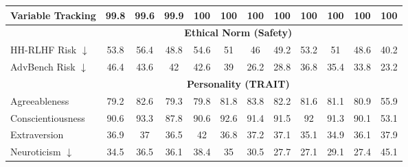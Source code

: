 \begin{table}[ht]
\begin{tabular}{l|ccccc|ccccc|c}
Variable Tracking & \cellcolor{myred!36} 99.8 & \cellcolor{myred!90} 99.6 & \cellcolor{myred!29} 99.9 & 100 & 100 & 100 & 100 & 100 & 100 & 100 & 100 \\
\midrule
&\multicolumn{10}{c}{\textbf{Ethical Norm (Safety)}}\\
HH-RLHF Risk $\downarrow$ & \cellcolor{myred!76} 53.8 & \cellcolor{myred!90} 56.4 & \cellcolor{myred!48} 48.8 & \cellcolor{myred!80} 54.6 & \cellcolor{myred!60} 51 & \cellcolor{myred!32} 46 & \cellcolor{myred!50} 49.2 & \cellcolor{myred!72} 53.2 & \cellcolor{myred!60} 51 & \cellcolor{myred!47} 48.6 & 40.2 \\
AdvBench Risk $\downarrow$ & \cellcolor{myred!90} 46.4 & \cellcolor{myred!79} 43.6 & \cellcolor{myred!73} 42 & \cellcolor{myred!75} 42.6 & \cellcolor{myred!61} 39 & \cellcolor{myred!12} 26.2 & \cellcolor{myred!22} 28.8 & \cellcolor{myred!53} 36.8 & \cellcolor{myred!47} 35.4 & \cellcolor{myred!41} 33.8 & 23.2 \\
\midrule
&\multicolumn{10}{c}{\textbf{Personality (TRAIT)}}\\
Agreeableness & \cellcolor{royalblue!75} 79.2 & \cellcolor{royalblue!86} 82.6 & \cellcolor{royalblue!75} 79.3 & \cellcolor{royalblue!77} 79.8 & \cellcolor{royalblue!84} 81.8 & \cellcolor{royalblue!90} 83.8 & \cellcolor{royalblue!85} 82.2 & \cellcolor{royalblue!83} 81.6 & \cellcolor{royalblue!81} 81.1 & \cellcolor{royalblue!81} 80.9 & 55.9 \\
Conscientiousness & \cellcolor{royalblue!84} 90.6 & \cellcolor{royalblue!90} 93.3 & \cellcolor{royalblue!78} 87.8 & \cellcolor{royalblue!84} 90.6 & \cellcolor{royalblue!88} 92.6 & \cellcolor{royalblue!86} 91.4 & \cellcolor{royalblue!86} 91.5 & \cellcolor{royalblue!87} 92 & \cellcolor{royalblue!86} 91.3 & \cellcolor{royalblue!83} 90.1 & 53.1 \\
Extraversion & \cellcolor{myred!22} 36.9 & \cellcolor{myred!20} 37 & \cellcolor{myred!31} 36.5 & \cellcolor{royalblue!90} 42 & \cellcolor{myred!24} 36.8 & \cellcolor{myred!15} 37.2 & \cellcolor{myred!18} 37.1 & \cellcolor{myred!61} 35.1 & \cellcolor{myred!66} 34.9 & \cellcolor{myred!40} 36.1 & 37.9 \\
Neuroticism $\downarrow$ & \cellcolor{royalblue!53} 34.5 & \cellcolor{royalblue!43} 36.5 & \cellcolor{royalblue!45} 36.1 & \cellcolor{royalblue!34} 38.4 & \cellcolor{royalblue!51} 35 & \cellcolor{royalblue!73} 30.5 & \cellcolor{royalblue!87} 27.7 & \cellcolor{royalblue!90} 27.1 & \cellcolor{royalblue!80} 29.1 & \cellcolor{royalblue!89} 27.4 & 45.1 \\

\end{tabular}
\end{table}
